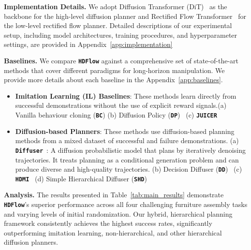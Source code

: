 \documentclass{article} %
\begin{document}
\textbf{Implementation Details.} We adopt Diffusion Transformer (DiT)~\citep{peebles2023scalable} as the backbone for the high-level diffusion planner and Rectified Flow Transformer~\citep{esser2024scaling} for the low-level rectified flow planner. Detailed descriptions of our experimental setup, including model architectures, training procedures, and hyperparameter settings, are provided in Appendix~\ref{app:implementation}

\textbf{Baselines.} We compare \texttt{\textbf{HDFlow}} against a comprehensive set of state-of-the-art methods that cover different paradigms for long-horizon manipulation. We provide more details about each baseline in the Appendix~\ref{app:baselines}.

\begin{itemize}
    \item \textbf{Imitation Learning (IL) Baselines}: These methods learn directly from successful demonstrations without the use of explicit reward signals.(a) Vanilla behaviour cloning (\texttt{\textbf{BC}}) (b) Diffusion Policy (\texttt{\textbf{DP}})~\citep{chi2023diffusion} (c) \texttt{\textbf{JUICER}}~\citep{ankile2024juicer}
    \item \textbf{Diffusion-based Planners}: These methods use diffusion-based planning methods from a mixed dataset of successful and failure demonstrations.  (a) \texttt{\textbf{Diffuser}}~\citep{janner2022planning}: A diffusion probabilistic model that plans by iteratively denoising trajectories. It treats planning as a conditional generation problem and can produce diverse and high-quality trajectories. (b) Decision Diffuser (\texttt{\textbf{DD}})~\citep{ajayconditional} (c) \texttt{\textbf{HDMI}}~\citep{li2023hierarchical} (d) Simple Hierarchical Diffuser (\texttt{\textbf{SHD}})~\citep{chensimple} 
\end{itemize}

\textbf{Analysis.}
The results presented in Table~\ref{tab:main_results} demonstrate \texttt{\textbf{HDFlow}}'s superior performance across all four challenging furniture assembly tasks and varying levels of initial randomization. Our hybrid, hierarchical planning framework consistently achieves the highest success rates, significantly outperforming imitation learning, non-hierarchical, and other hierarchical diffusion planners. 
\end{document}

